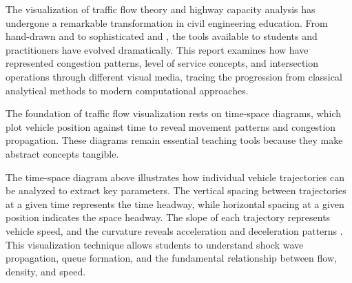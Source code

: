 The visualization of traffic flow theory and highway capacity analysis has undergone a remarkable transformation in civil engineering education. From hand-drawn  and  to sophisticated  and , the tools available to students and practitioners have evolved dramatically. This report examines how  have represented congestion patterns, level of service concepts, and intersection operations through different visual media, tracing the progression from classical analytical methods to modern computational approaches.

The foundation of traffic flow visualization rests on time-space diagrams, which plot vehicle position against time to reveal movement patterns and congestion propagation. These diagrams remain essential teaching tools because they make abstract concepts tangible.

The time-space diagram above illustrates how individual vehicle trajectories can be analyzed to extract key parameters. The vertical spacing between trajectories at a given time represents the time headway, while horizontal spacing at a given position indicates the space headway. The slope of each trajectory represents vehicle speed, and the curvature reveals acceleration and deceleration patterns . This visualization technique allows students to understand shock wave propagation, queue formation, and the fundamental relationship between flow, density, and speed.

